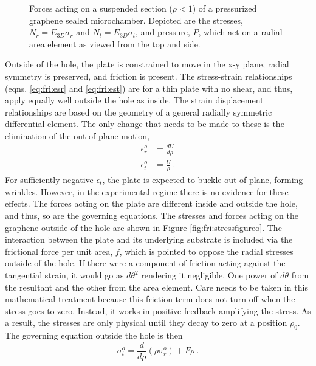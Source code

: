 \begin{figure}
	\begin{center}
	
	\end{center}
	\caption[Forces acting on suspended, pressurized graphene]{\label{fig:fri:stressfigurei}
	Forces acting on a suspended section ($\rho<1$) of a pressurized graphene sealed microchamber.
	Depicted are the stresses, $N_r=E_{3D} \sigma_r$ and $N_t=E_{3D} \sigma_t$, and pressure, $P$, which act on a radial area element as viewed from the top and side.
	}
\end{figure}

Outside of the hole, the plate is constrained to move in the x-y plane, radial symmetry is preserved, and friction is present. 
The stress-strain relationships (eqns. \ref{eq:fri:esr} and \ref{eq:fri:est}) are for a thin plate with no shear, and thus, apply equally well outside the hole as inside.
The strain displacement relationships are based on the geometry of a general radially symmetric differential element.
The only change that needs to be made to these is the elimination of the out of plane motion, 
\begin{align}
	\epsilon_r^o&=\frac{dU}{d\rho} \label{eq:fri:edro}\\
	\epsilon_t^o&=\frac{U}{\rho} \label{eq:fri:edto} \ .
\end{align}
For sufficiently negative $\epsilon_t$, the plate is expected to buckle out-of-plane, forming wrinkles.
However, in the experimental regime there is no evidence for these effects.
The forces acting on the plate are different inside and outside the hole, and thus, so are the governing equations.
The stresses and forces acting on the graphene outside of the hole are shown in Figure \ref{fig:fri:stressfigureo}.
The interaction between the plate and its underlying substrate is included via the frictional force per unit area, $f$, which is pointed to oppose the radial stresses outside of the hole.
If there were a component of friction acting against the tangential strain, it would go as $d \theta^2$ rendering it negligible.
One power of $d \theta$ from the resultant and the other from the area element.
Care needs to be taken in this mathematical treatment because this friction term does not turn off when the stress goes to zero.
Instead, it works in positive feedback amplifying the stress. 
As a result, the stresses are only physical until they decay to zero at a position $\rho_0$.
The governing equation outside the hole is then
\begin{equation}
	\sigma_t^o=\frac{d}{d\rho}(\rho \sigma_r^o)+F \rho  \ .
	\label{eq:fri:g1o}
\end{equation}
